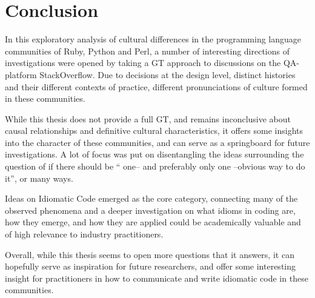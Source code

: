 \section{Conclusion}

In this exploratory analysis of cultural differences in the programming language communities of Ruby, Python and Perl,
a number of interesting directions of investigations were opened by taking a GT approach to discussions on the QA-platform
StackOverflow. Due to decisions at the design level, distinct histories and their different contexts of practice,
different pronunciations of culture formed in these communities.

While this thesis does not provide a full GT, and remains inconclusive about causal relationships and definitive cultural
characteristics, it offers some insights into the character of these communities, and can serve as a springboard for
future investigations. A lot of focus was put on disentangling the ideas surrounding the question of if there should be
“ one-- and preferably only one --obvious way to do it”, or many ways.

Ideas on Idiomatic Code emerged as the core category, connecting many of the observed phenomena and a deeper
investigation on what idioms in coding are, how they emerge, and how they are applied could be academically valuable
and of high relevance to industry practitioners.

Overall, while this thesis seems to open more questions that it answers, it can hopefully serve as inspiration for
future researchers, and offer some interesting insight for practitioners in how to communicate and write idiomatic
code in these communities.
